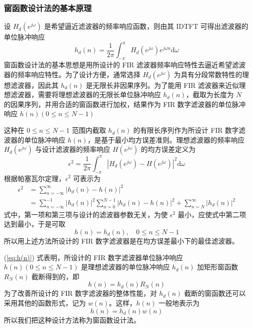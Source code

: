\documentclass[12pt,AutoFakeBold]{article}
\begin{document}
\subsubsection{窗函数设计法的基本原理}

设 $H_d(e^{j\omega})$ 是希望逼近滤波器的频率响应函数，则由其 IDTFT 可得出滤波器的单位脉冲响应
%
\begin{equation}
h_d(n)=\frac{1}{2\pi}\int_{-\pi}^{\pi}H_d(e^{j\omega})e^{j\omega n}\mathrm{d}\omega
\end{equation}
%
窗函数设计法的基本思想是用所设计的 FIR 滤波器频率响应特性去逼近希望滤波器的频率响应特性。为了设计方便，通常选择 $H_d(e^{j\omega})$ 为具有分段常数特性的理想滤波器，因此其 $h_d(n)$ 是无限长非因果序列。为了能用 FIR 滤波器来近似理想滤波器，需要将理想滤波器的无限长单位脉冲响应 $h_d(n)$，截取为长度为 $N$ 的因果序列，并用合适的窗函数进行加权，结果作为 FIR 数字滤波器的单位脉冲响应 $h(n)(0\le n\le N-1)$

这种在 $0\le n\le N-1$ 范围内截取 $h_d(n)$ 的有限长序列作为所设计 FIR 数字滤波器的单位脉冲响应 $h(n)$，是基于最小均方误差准则。理想滤波器的频率响应 $H_d(e^{j\omega})$ 与设计滤波器的频率响应 $H(e^{j\omega})$ 的均方误差定义为
%
\begin{equation}
\epsilon^2=\frac{1}{2\pi}\int_{-\pi}^{\pi}|H_d(e^{j\omega})-H(e^{j\omega})|^2\mathrm{d}\omega
\end{equation}
%
根据帕塞瓦尔定理，$\epsilon^2$ 可表示为
%
\begin{equation}
\begin{aligned}
\epsilon^2 &= \sum_{n=-\infty}^{\infty}|h_d(n)-h(n)|^2 \\
           &= \sum_{n=-\infty}^{-1}|h_d(n)|^2\sum_{n=0}^{N-1}|h_d(n)-h(n)|^2+\sum_{n=N}^{\infty}|h_d(n)|^2
\end{aligned}
\end{equation}
%
式中，第一项和第三项与设计的滤波器参数无关，为使 $\epsilon^2$ 最小，应使式中第二项达到最小，于是可取
%
\begin{equation} \label{eq:h(n)}
h(n)=h_d(n),\quad 0\le n\le N-1
\end{equation}
%
所以用上述方法所设计的 FIR 数字滤波器是在均方误差最小下的最佳滤波器。

(\ref{eq:h(n)}) 式表明，所设计的 FIR 数字滤波器单位脉冲响应 $h(n)(0\le n\le N-1)$ 是理想滤波器的单位脉冲响应 $h_d(n)$ 加矩形窗函数 $R_N(n)$ 截断得到的，即
%
\begin{equation}
h(n)=h_d(n)R_N(n)
\end{equation}
%
为了改善所设计的 FIR 数字滤波器的整体性能，对 $h_d(n)$ 截断的窗函数还可以采用其他的函数形式，记为 $w(n)$。这样，$h(n)$ 一般地表示为
%
\begin{equation}
h(n)=h_d(n)w(n)
\end{equation}
%
所以我们把这种设计方法称为窗函数设计法。
\end{document}
